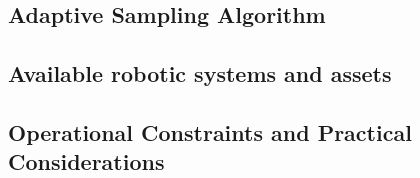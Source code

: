 \subsection{Adaptive Sampling Algorithm}
\subsection{Available robotic systems and assets}


\subsection{Operational Constraints and Practical Considerations}


    



